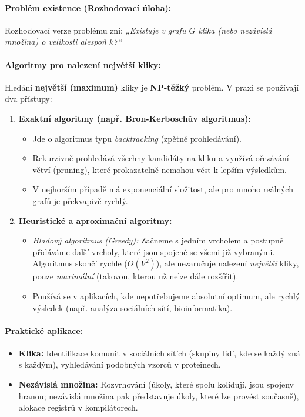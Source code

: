\paragraph*{Problém existence (Rozhodovací úloha):}
Rozhodovací verze problému zní: \textit{„Existuje v grafu $G$ klika (nebo nezávislá množina) o velikosti alespoň $k$?“}

\paragraph*{Algoritmy pro nalezení největší kliky:}
Hledání \textbf{největší (maximum)} kliky je \textbf{NP-těžký} problém. V praxi se používají dva přístupy:

\begin{enumerate}
    \item \textbf{Exaktní algoritmy (např. Bron-Kerboschův algoritmus):}
    \begin{itemize}
        \item Jde o algoritmus typu \textit{backtracking} (zpětné prohledávání).
        \item Rekurzivně prohledává všechny kandidáty na kliku a využívá ořezávání větví (pruning), které prokazatelně nemohou vést k lepším výsledkům.
        \item V nejhorším případě má exponenciální složitost, ale pro mnoho reálných grafů je překvapivě rychlý.
    \end{itemize}
    
    \item \textbf{Heuristické a aproximační algoritmy:}
    \begin{itemize}
        \item \textit{Hladový algoritmus (Greedy):} Začneme s jedním vrcholem a postupně přidáváme další vrcholy, které jsou spojené se všemi již vybranými. Algoritmus skončí rychle ($O(V^2)$), ale nezaručuje nalezení \textit{největší} kliky, pouze \textit{maximální} (takovou, kterou už nelze dále rozšířit).
        \item Používá se v aplikacích, kde nepotřebujeme absolutní optimum, ale rychlý výsledek (např. analýza sociálních sítí, bioinformatika).
    \end{itemize}
\end{enumerate}

\paragraph*{Praktické aplikace:}
\begin{itemize}
    \item \textbf{Klika:} Identifikace komunit v sociálních sítích (skupiny lidí, kde se každý zná s každým), vyhledávání podobných vzorců v proteinech.
    \item \textbf{Nezávislá množina:} Rozvrhování (úkoly, které spolu kolidují, jsou spojeny hranou; nezávislá množina pak představuje úkoly, které lze provést současně), alokace registrů v kompilátorech.
\end{itemize}

